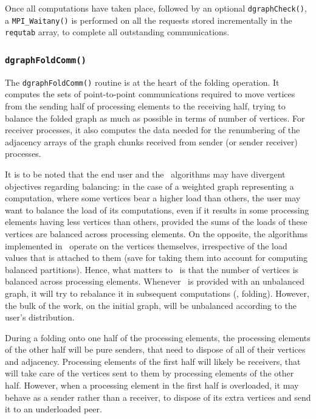 Once all computations have taken place, followed by an optional
\texttt{dgraph\lbt Check()}, a \texttt{MPI\_\lbt Waitany()} is
performed on all the requests stored incrementally in the
\texttt{requtab} array, to complete all outstanding communications.

\subsubsection{\texttt{dgraphFoldComm()}}
\label{sec-code-dgraphfoldcomm}

The \texttt{dgraphFoldComm()} routine is at the heart of the folding
operation. It computes the sets of point-to-point communications
required to move vertices from the sending half of processing elements
to the receiving half, trying to balance the folded graph as much as
possible in terms of number of vertices. For receiver processes, it
also computes the data needed for the renumbering of the adjacency
arrays of the graph chunks received from sender (or sender receiver)
processes.

It is to be noted that the end user and the \scotch\ algorithms may
have divergent objectives regarding balancing: in the case of a
weighted graph representing a computation, where some vertices bear a
higher load than others, the user may want to balance the load of its
computations, even if it results in some processing elements having
less vertices than others, provided the sums of the loads of these
vertices are balanced across processing elements. On the opposite, the
algorithms implemented in \scotch\ operate on the vertices themselves,
irrespective of the load values that is attached to them (save for
taking them into account for computing balanced partitions). Hence,
what matters to \scotch\ is that the number of vertices is balanced
across processing elements. Whenever \scotch\ is provided with an
unbalanced graph, it will try to rebalance it in subsequent
computations (\eg, folding). However, the bulk of the work, on the
initial graph, will be unbalanced according to the user's
distribution.

During a folding onto one half of the processing elements, the
processing elements of the other half will be pure
senders, that need to dispose of all of their vertices and
adjacency. Processing elements of the first half will likely be
receivers, that will take care of the vertices sent to them by
processing elements of the other half. However, when a processing
element in the first half is overloaded, it may behave as a
sender rather than a receiver, to dispose of its extra vertices and
send it to an underloaded peer.

